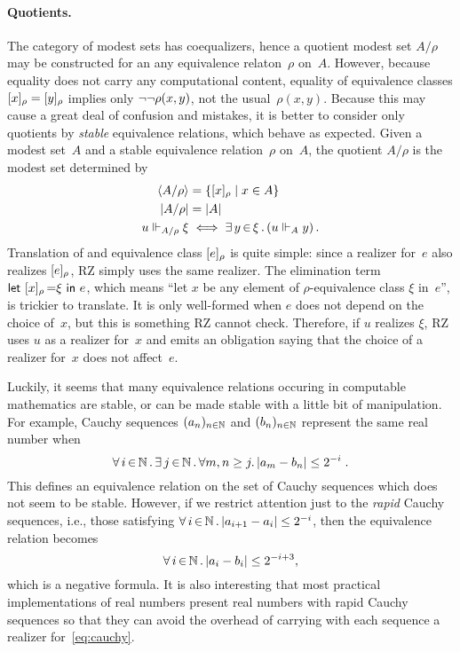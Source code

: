\paragraph{Quotients.}
%
The category of modest sets has coequalizers, hence a quotient modest
set $A/\rho$ may be constructed for an any equivalence relaton~$\rho$
on~$A$. However, because equality does not carry any computational
content, equality of equivalence classes $[x]_{\rho} =
[y]_{\rho}$ implies only $\lnot \lnot \rho(x,y)$, not the
usual~$\rho(x,y)$. Because this may cause a great deal of confusion
and mistakes, it is better to consider only quotients by \emph{stable}
equivalence relations, which behave as expected.
%
Given a modest set~$A$ and a stable equivalence relation~$\rho$
on~$A$, the quotient $A/\rho$ is the modest set determined by
%
\begin{align*}
  \langle A/\rho \rangle &= \{[x]_{\rho} \mid x \in A\} \\
  |A/\rho| &= |A| \\
  u \Vdash_{A/\rho} \xi &\iff \exists\, y \,{\in}\, \xi\,.\left(u \Vdash_A y\right).
\end{align*}
%
Translation of and equivalence class $[e]_{\rho}$ is quite
simple: since a realizer for~$e$ also realizes $[e]_{\rho}$, RZ
simply uses the same realizer. The elimination term
$\textsf{let}\ [x]_{\rho}\,{=}\xi\ \textsf{in}\ e$, which means ``let $x$ be any element
of $\rho$-equivalence class $\xi$ in~$e$'', is trickier to translate.
It is only well-formed when $e$ does not depend on the choice of~$x$,
but this is something RZ cannot check. Therefore, if $u$ realizes
$\xi$, RZ uses $u$ as a realizer for~$x$ and emits an obligation
saying that the choice of a realizer for~$x$ does not affect~$e$.

Luckily, it seems that many equivalence relations occuring in
computable mathematics are stable, or can be made stable with a little
bit of manipulation. For example, Cauchy sequences $(a_n)_{n\in\mathbb{N}}$
and $(b_n)_{n\in\mathbb{N}}$ represent the same real number when
%
\begin{equation}
  \label{eq:cauchy}%
  \xall{i}{\NN}{
    \xsome{j}{\NN}{
      \forall m,n \geq j.\,|a_m - b_n| \leq 2^{-i}
    }
  } \;.
\end{equation}
%
This defines an equivalence relation on the set of Cauchy sequences
which does not seem to be stable. However, if we restrict attention
just to the \emph{rapid} Cauchy sequences, i.e., those satisfying
$\forall\, i \,{\in}\, \mathbb{N}\,.\,|a_{i+1} - a_i| \leq 2^{-i}$, then the equivalence
relation becomes
%
\begin{equation*}
  \forall\, i \,{\in}\, \mathbb{N}\,.\,|a_i - b_i| \leq 2^{-i+3},
\end{equation*}
%
which is a negative formula. It is also interesting that most
practical implementations of real numbers present real numbers with
rapid Cauchy sequences so that they can avoid the overhead of carrying
with each sequence a realizer for~\eqref{eq:cauchy}.



